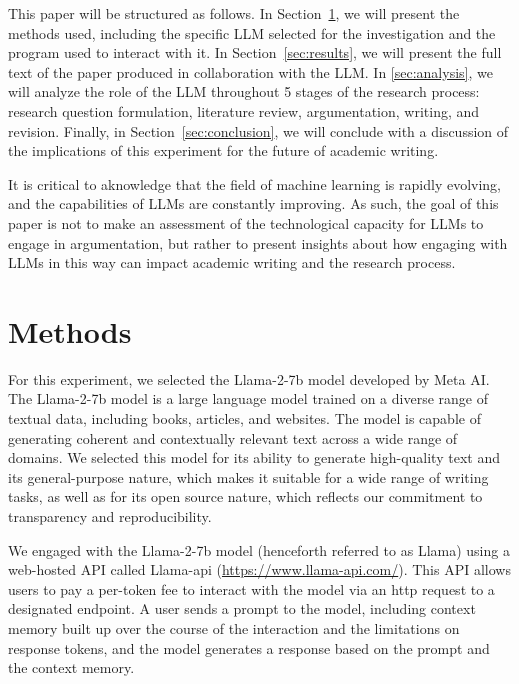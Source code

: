 \documentclass[11pt, a4paper, hyphens]{article}
\begin{document}
This paper will be structured as follows. In Section~\ref{sec:methods}, we will
present the methods used, including the specific LLM selected for the
investigation and the program used to interact with it. In
Section~\ref{sec:results}, we will present the full text of the paper produced
in collaboration with the LLM. In \ref{sec:analysis}, we will analyze the role
of the LLM throughout 5 stages of the research process: research question
formulation, literature review, argumentation, writing, and revision. Finally,
in Section~\ref{sec:conclusion}, we will conclude with a discussion of the
implications of this experiment for the future of academic writing.

It is critical to aknowledge that the field of machine learning is rapidly
evolving, and the capabilities of LLMs are constantly improving. As such, the
goal of this paper is not to make an assessment of the technological capacity
for LLMs to engage in argumentation, but rather to present insights about how
engaging with LLMs in this way can impact academic writing and the research
process.

\section{Methods}\label{sec:methods}

For this experiment, we selected the Llama-2-7b model developed by Meta AI. The
Llama-2-7b model is a large language model trained on a diverse range of
textual data, including books, articles, and websites. The model is capable of
generating coherent and contextually relevant text across a wide range of
domains. We selected this model for its ability to generate high-quality text
and its general-purpose nature, which makes it suitable for a wide range of
writing tasks, as well as for its open source nature, which reflects our
commitment to transparency and reproducibility.

We engaged with the Llama-2-7b model (henceforth referred to as Llama) using a
web-hosted API called Llama-api (\url{https://www.llama-api.com/}). This API
allows users to pay a per-token fee to interact with the model via an http
request to a designated endpoint. A user sends a prompt to the model, including
context memory built up over the course of the interaction and the limitations
on response tokens, and the model generates a response based on the prompt and
the context memory.
\end{document}
